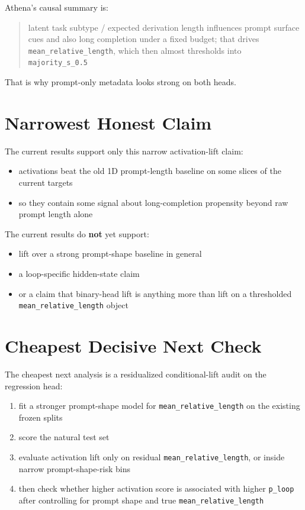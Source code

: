 \documentclass[11pt]{article}
\begin{document}
Athena's causal summary is:
\begin{quote}
latent task subtype / expected derivation length influences prompt surface cues and also long completion under a fixed budget; that drives \texttt{mean\_relative\_length}, which then almost thresholds into \texttt{majority\_s\_0.5}
\end{quote}

That is why prompt-only metadata looks strong on both heads.

\section*{Narrowest Honest Claim}
The current results support only this narrow activation-lift claim:
\begin{itemize}[leftmargin=1.5em]
\item activations beat the old 1D prompt-length baseline on some slices of the current targets
\item so they contain some signal about long-completion propensity beyond raw prompt length alone
\end{itemize}

The current results do \textbf{not} yet support:
\begin{itemize}[leftmargin=1.5em]
\item lift over a strong prompt-shape baseline in general
\item a loop-specific hidden-state claim
\item or a claim that binary-head lift is anything more than lift on a thresholded \texttt{mean\_relative\_length} object
\end{itemize}

\section*{Cheapest Decisive Next Check}
The cheapest next analysis is a residualized conditional-lift audit on the regression head:
\begin{enumerate}[leftmargin=1.5em]
\item fit a stronger prompt-shape model for \texttt{mean\_relative\_length} on the existing frozen splits
\item score the natural test set
\item evaluate activation lift only on residual \texttt{mean\_relative\_length}, or inside narrow prompt-shape-risk bins
\item then check whether higher activation score is associated with higher \texttt{p\_loop} after controlling for prompt shape and true \texttt{mean\_relative\_length}
\end{enumerate}
\end{document}

